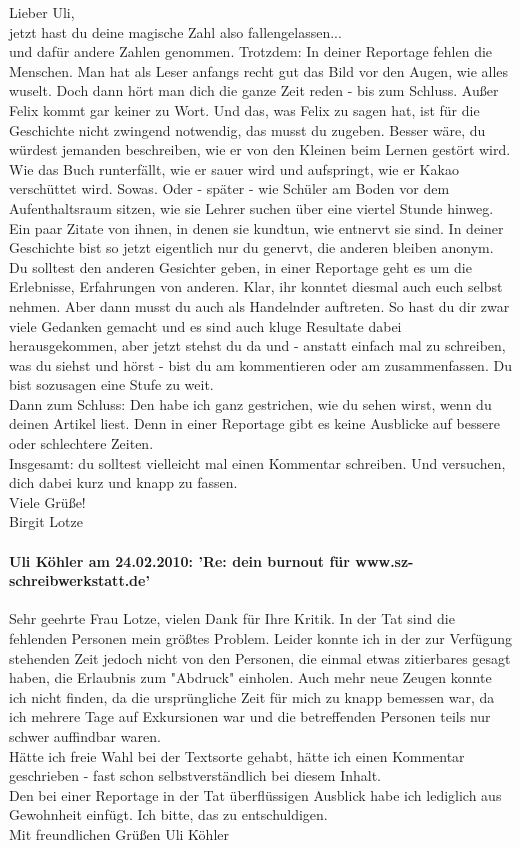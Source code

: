 \documentclass[a4paper,12pt,oneside]{scrbook}
\begin{document}
Lieber Uli,
\\
jetzt hast du deine magische Zahl also fallengelassen...
\\
und dafür andere Zahlen genommen. Trotzdem: In deiner Reportage fehlen die Menschen. Man hat als Leser anfangs recht gut das Bild vor den Augen, wie alles wuselt. Doch dann hört man dich die ganze Zeit reden - bis zum Schluss. Außer Felix kommt gar keiner zu Wort. Und das, was Felix zu sagen hat, ist für die Geschichte nicht zwingend notwendig, das musst du zugeben. Besser wäre, du würdest jemanden beschreiben, wie er von den Kleinen beim Lernen gestört wird. Wie das Buch runterfällt, wie er sauer wird und aufspringt, wie er Kakao verschüttet wird. Sowas. Oder - später - wie Schüler am Boden vor dem Aufenthaltsraum sitzen, wie sie Lehrer suchen über eine viertel Stunde hinweg. Ein paar Zitate von ihnen, in denen sie kundtun, wie entnervt sie sind.
In deiner Geschichte bist so jetzt eigentlich nur du genervt, die anderen bleiben anonym. Du solltest den anderen Gesichter geben, in einer Reportage geht es um die Erlebnisse, Erfahrungen von anderen. Klar, ihr konntet diesmal auch euch selbst nehmen. Aber dann musst du auch als Handelnder auftreten. So hast du dir zwar viele Gedanken gemacht und es sind auch kluge Resultate dabei herausgekommen, aber jetzt stehst du da und - anstatt einfach mal zu schreiben, was du siehst und hörst - bist du am kommentieren oder am zusammenfassen. Du bist sozusagen eine Stufe zu weit.
\\
Dann zum Schluss: Den habe ich ganz gestrichen, wie du sehen wirst, wenn du deinen Artikel liest. Denn in einer Reportage gibt es keine Ausblicke auf bessere oder schlechtere Zeiten.
\\
Insgesamt: du solltest vielleicht mal einen Kommentar schreiben. Und versuchen, dich dabei kurz und knapp zu fassen.
\\
Viele Grüße!
\\
Birgit Lotze
\paragraph{Uli Köhler am 24.02.2010: 'Re: dein burnout für www.sz-schreibwerkstatt.de'}

Sehr geehrte Frau Lotze,
vielen Dank für Ihre Kritik.
In der Tat sind die fehlenden Personen mein größtes Problem. Leider
konnte ich in der zur Verfügung stehenden Zeit jedoch nicht von den
Personen, die einmal etwas zitierbares gesagt haben, die Erlaubnis zum
"Abdruck" einholen. Auch mehr neue Zeugen konnte ich nicht finden, da
die ursprüngliche Zeit für mich zu knapp bemessen war, da ich mehrere
Tage auf Exkursionen war und die betreffenden Personen teils nur schwer
auffindbar waren.
\\
Hätte ich freie Wahl bei der Textsorte gehabt, hätte ich einen Kommentar
geschrieben - fast schon selbstverständlich bei diesem Inhalt.
\\
Den bei einer Reportage in der Tat überflüssigen Ausblick habe ich
lediglich aus Gewohnheit einfügt. Ich bitte, das zu entschuldigen.
\\
Mit freundlichen Grüßen
Uli Köhler
\end{document}
